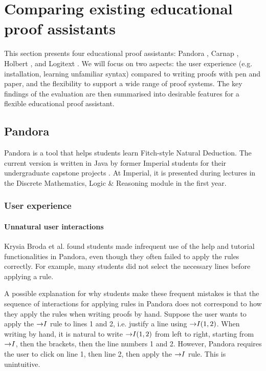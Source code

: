 
\section{Comparing existing educational proof assistants}
\label{background:comparison}
This section presents four educational proof assistants: Pandora \cite{pandora:2007, pandora}, Carnap \cite{carnap, carnap:2018}, Holbert \cite{oconnor:2022}, and Logitext \cite{yang:2022}. We will focus on two aspects: the user experience (e.g. installation, learning unfamiliar syntax) compared to writing proofs with pen and paper, and the flexibility to support a wide range of proof systems. The key findings of the evaluation are then summarised into desirable features for a flexible educational proof assistant.

\subsection{Pandora}
Pandora \cite{pandora:2007} is a tool that helps students learn Fitch-style \cite{fitch:1952} Natural Deduction. The current version \cite{pandora} is written in Java \cite{java} by former Imperial students for their undergraduate capstone projects \cite{pandora:2007}. At Imperial, it is presented during lectures in the Discrete Mathematics, Logic \& Reasoning module \cite{dmlr} in the first year.

\subsubsection{User experience}
\paragraph{Unnatural user interactions}
Krysia Broda et al. \cite{pandora:2007} found students made infrequent use of the help and tutorial functionalities in Pandora, even though they often failed to apply the rules correctly. For example, many students did not select the necessary lines before applying a rule.

A possible explanation for why students make these frequent mistakes is that the sequence of interactions for applying rules in Pandora does not correspond to how they apply the rules when writing proofs by hand. Suppose the user wants to apply the $\mathord{\to} I$ rule to lines 1 and 2, i.e. justify a line using $\mathord{\to} I(1, 2)$. When writing by hand, it is natural to write $\mathord{\to} I(1, 2)$ from left to right, starting from $\mathord{\to} I$, then the brackets, then the line numbers 1 and 2. However, Pandora requires the user to click on line 1, then line 2, then apply the $\mathord{\to} I$ rule. This is unintuitive.

